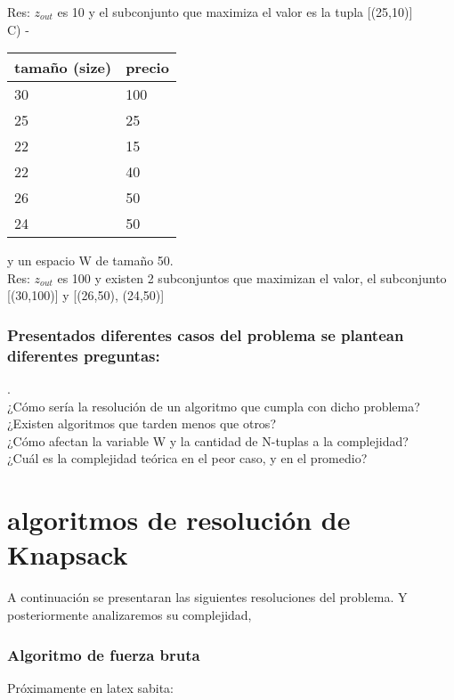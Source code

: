 \documentclass[fleqn, 11pt]{article}
\begin{document}
Res: $z_{out}$ es 10 y el subconjunto que maximiza el valor es la tupla [(25,10)] \\

C) - 
\begin{tabular}{l l}
	tamaño (size) & precio \\ \toprule
    30 & 100 \\
    25 & 25  \\
    22 & 15  \\
    22 & 40  \\
    26 & 50  \\
    24 & 50  \\

\end{tabular}
y un espacio W de tamaño 50. \\

Res: $z_{out}$ es 100 y existen 2 subconjuntos que maximizan el valor, el subconjunto [(30,100)] y [(26,50), (24,50)]

\subsubsection{Presentados diferentes casos del problema se plantean diferentes preguntas: } 

.\\
¿Cómo sería la resolución de un algoritmo que cumpla con dicho problema?  \\
¿Existen algoritmos que tarden menos que otros?  \\
¿Cómo afectan la variable W y la cantidad de N-tuplas a la complejidad? \\ 
¿Cuál es la complejidad teórica en el peor caso, y en el promedio?  \\

\maketitle
\section{algoritmos de resolución de Knapsack} 

A continuación se presentaran las siguientes resoluciones del problema. Y posteriormente analizaremos su complejidad, 

\subsubsection{Algoritmo de fuerza bruta}

Próximamente en latex sabita:
\end{document}
